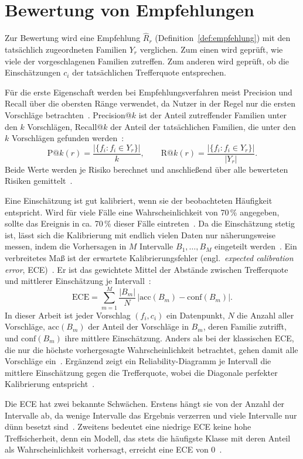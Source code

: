 \section{Bewertung von Empfehlungen}\label{sec:metriken}
Zur Bewertung wird eine Empfehlung $\hat{R}_r$ (Definition~\ref{def:empfehlung}) mit den tatsächlich zugeordneten Familien $Y_r$ verglichen.
Zum einen wird geprüft, wie viele der vorgeschlagenen Familien zutreffen.
Zum anderen wird geprüft, ob die Einschätzungen $c_i$ der tatsächlichen Trefferquote entsprechen.

Für die erste Eigenschaft werden bei Empfehlungsverfahren meist Precision und Recall über die obersten Ränge verwendet, da Nutzer in der Regel nur die ersten Vorschläge betrachten~\cite[S.~1748]{Krichene2020}.
Precision@$k$ ist der Anteil zutreffender Familien unter den $k$ Vorschlägen, Recall@$k$ der Anteil der tatsächlichen Familien, die unter den $k$ Vorschlägen gefunden werden~\cite[S.~1749]{Krichene2020}:
\[
  \mathrm{P@}k(r) = \frac{|\{f_i : f_i \in Y_r\}|}{k},
  \qquad
  \mathrm{R@}k(r) = \frac{|\{f_i : f_i \in Y_r\}|}{|Y_r|}.
\]
Beide Werte werden je Risiko berechnet und anschließend über alle bewerteten Risiken gemittelt~\cite[S.~1749]{Krichene2020}.

Eine Einschätzung ist gut kalibriert, wenn sie der beobachteten Häufigkeit entspricht.
Wird für viele Fälle eine Wahrscheinlichkeit von 70\,\% angegeben, sollte das Ereignis in ca. 70\,\% dieser Fälle eintreten~\cite[S.~2]{Pavlovic2025}.
Da die Einschätzung stetig ist, lässt sich die Kalibrierung mit endlich vielen Daten nur näherungsweise messen, indem die Vorhersagen in $M$ Intervalle $B_1, \dots, B_M$ eingeteilt werden~\cite[S.~7]{Wang2025}.
Ein verbreitetes Maß ist der erwartete Kalibrierungsfehler (engl.~\emph{expected calibration error}, ECE)~\cite[S.~5]{Pavlovic2025}.
Er ist das gewichtete Mittel der Abstände zwischen Trefferquote und mittlerer Einschätzung je Intervall~\cites[S.~7]{Wang2025}[S.~3]{Pavlovic2025}:
\[
  \mathrm{ECE} = \sum_{m=1}^{M} \frac{|B_m|}{N} \, \bigl| \mathrm{acc}(B_m) - \mathrm{conf}(B_m) \bigr|.
\]
In dieser Arbeit ist jeder Vorschlag $(f_i, c_i)$ ein Datenpunkt, $N$ die Anzahl aller Vorschläge, $\mathrm{acc}(B_m)$ der Anteil der Vorschläge in $B_m$, deren Familie zutrifft, und $\mathrm{conf}(B_m)$ ihre mittlere Einschätzung.
Anders als bei der klassischen ECE, die nur die höchste vorhergesagte Wahrscheinlichkeit betrachtet, gehen damit alle Vorschläge ein~\cite[S.~7]{Pavlovic2025}.
Ergänzend zeigt ein Reliability-Diagramm je Intervall die mittlere Einschätzung gegen die Trefferquote, wobei die Diagonale perfekter Kalibrierung entspricht~\cite[S.~8]{Wang2025}.

Die ECE hat zwei bekannte Schwächen.
Erstens hängt sie von der Anzahl der Intervalle ab, da wenige Intervalle das Ergebnis verzerren und viele Intervalle nur dünn besetzt sind~\cites[S.~6]{Wang2025}[S.~6--7]{Pavlovic2025}.
Zweitens bedeutet eine niedrige ECE keine hohe Treffsicherheit, denn ein Modell, das stets die häufigste Klasse mit deren Anteil als Wahrscheinlichkeit vorhersagt, erreicht eine ECE von 0~\cite[S.~6]{Pavlovic2025}.